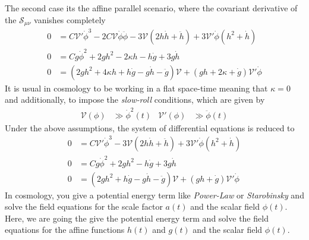 \documentclass[10pt,a4paper]{article}
\begin{document}
The second case its the affine parallel scenario, where the covariant derivative of the $\mathcal{S}_{\mu\nu}$ vanishes completely
\begin{align}
  0 & = C\mathcal{V}'\dot{\phi}^3-2C\mathcal{V}\dot{\phi}\ddot{\phi} - 3\mathcal{V}\left(2h\dot{h} + \ddot{h}\right) + 3\mathcal{V}'\dot{\phi}
  \left(h^{2} + \dot{h}\right) \\
  0 & = Cg\dot{\phi}^2 + 2gh^2 - 2\kappa h - h\dot{g} + 3g\dot{h} \\
  0 & = \left(2gh^2 + 4\kappa h +h\dot{g} - g \dot{h} - \ddot{g}\right)\mathcal{V} + \left(gh + 2\kappa + \dot{g}\right)\mathcal{V}'\dot{\phi}
\end{align}
It is usual in cosmology to be working in a flat space-time meaning that $\kappa = 0$ and additionally, to impose the \textit{slow-roll} conditions,
which are given by
\begin{align}
  \mathcal{V}(\phi) & \gg \dot{\phi}^{2}(t) & \mathcal{V}'(\phi) & \gg \ddot{\phi}(t)
\end{align}
Under the above assumptions, the system of differential equations is reduced to
\begin{align}
  0 & = C\mathcal{V}'\dot{\phi}^3 - 3\mathcal{V}\left(2h\dot{h} + \ddot{h}\right) + 3\mathcal{V}'\dot{\phi}
  \left(h^{2} + \dot{h}\right) \\
  0 & = Cg\dot{\phi}^2 + 2gh^2  - h\dot{g} + 3g\dot{h} \\
  0 & = \left(2gh^2  +h\dot{g} - g \dot{h} - \ddot{g}\right)\mathcal{V} + \left(gh + \dot{g}\right)\mathcal{V}'\dot{\phi}
\end{align}
In cosmology, you give a potential energy term like \textit{Power-Law} or \textit{Starobinsky} and solve the field equations for the scale factor $a(t)$
and the scalar field $\phi(t)$. Here, we are going the give the potential energy term and solve the field equations for the affine functions
$h(t)$ and $g(t)$ and the scalar field $\phi(t)$.
\end{document}
